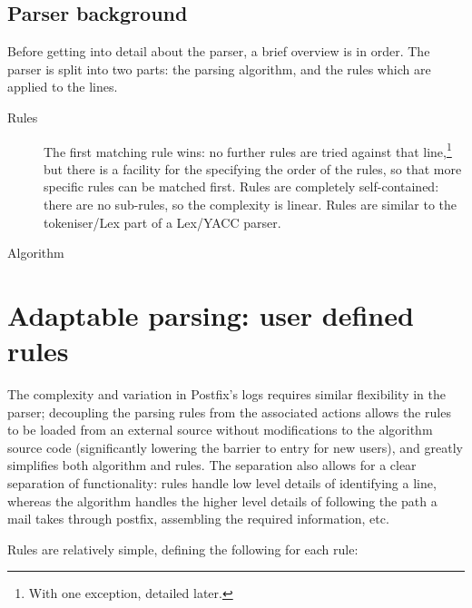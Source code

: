 \documentclass[a4paper,12pt,draft]{article}
\begin{document}
\subsection{Parser background}

Before getting into detail about the parser, a brief overview is in order.
The parser is split into two parts: the parsing algorithm, and the rules
which are applied to the lines.  

\begin{description}

    \item [Rules] The first matching rule wins: no further rules are tried
        against that line,\footnote{With one exception, detailed later.}
        but there is a facility for the specifying the order of the rules,
        so that more specific rules can be matched first.  Rules are
        completely self-contained: there are no sub-rules, so the
        complexity is linear.  Rules are similar to the tokeniser/Lex part
        of a Lex/YACC parser.

    \item [Algorithm]

\end{description}



\section{Adaptable parsing: user defined rules}

The complexity and variation in Postfix's logs requires similar flexibility
in the parser; decoupling the parsing rules from the associated actions
allows the rules to be loaded from an external source without modifications
to the algorithm source code (significantly lowering the barrier to entry
for new users), and greatly simplifies both algorithm and rules.  The
separation also allows for a clear separation of functionality: rules
handle low level details of identifying a line, whereas the algorithm
handles the higher level details of following the path a mail takes through
postfix, assembling the required information, etc.

Rules are relatively simple, defining the following for each rule:
\end{document}
